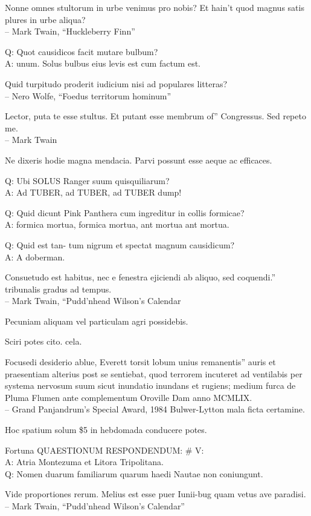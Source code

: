 \documentclass[titlepage,12pt]{memoir}
\begin{document}
Nonne omnes stultorum in urbe venimus pro nobis? Et hain’t quod magnus
satis plures in urbe aliqua?
\\-- Mark Twain, “Huckleberry Finn”

Q: Quot causidicos facit mutare bulbum?\\
A: unum. Solus bulbus eius levis est cum factum est.

Quid turpitudo proderit iudicium nisi ad populares litteras?
\\-- Nero Wolfe, “Foedus territorum hominum”

Lector, puta te esse stultus. Et putant esse membrum of”
Congressus. Sed repeto me.
\\-- Mark Twain

Ne dixeris hodie magna mendacia. Parvi possunt esse aeque ac efficaces.

Q: Ubi SOLUS Ranger suum quisquiliarum?\\
A: Ad TUBER, ad TUBER, ad TUBER dump!

Q: Quid dicunt Pink Panthera cum ingreditur in collis formicae?\\
A: formica mortua, formica mortua, ant mortua ant mortua.

Q: Quid est tan- tum nigrum et spectat magnum causidicum?\\
A: A doberman.

Consuetudo est habitus, nec e fenestra ejiciendi ab aliquo, sed coquendi.”
tribunalis gradus ad tempus.
\\-- Mark Twain, “Pudd’nhead Wilson’s Calendar

 Pecuniam aliquam vel particulam agri possidebis.

Sciri potes cito. cela.

Focusedi desiderio ablue, Everett torsit lobum unius remanentis”
auris et praesentiam alterius post se sentiebat, quod terrorem incuteret
ad ventilabis per systema nervosum suum sicut inundatio inundans et rugiens;
medium furca de Pluma Flumen ante complementum Oroville Dam
anno MCMLIX.
\\-- Grand Panjandrum’s Special Award, 1984 Bulwer-Lytton
mala ficta certamine.

Hoc spatium solum \$5 in hebdomada conducere potes.

Fortuna QUAESTIONUM RESPONDENDUM: \# V:\\
A: Atria Montezuma et Litora Tripolitana.
\\Q: Nomen duarum familiarum quarum haedi Nautae non coniungunt.

Vide proportiones rerum. Melius est esse puer Iunii-bug
quam vetus ave paradisi.
\\-- Mark Twain, “Pudd’nhead Wilson’s Calendar”
\end{document}
